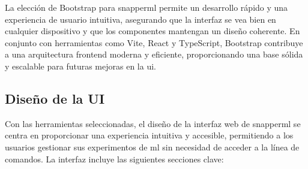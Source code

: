 

La elección de Bootstrap para \Gls{snapperml} permite un desarrollo rápido y una experiencia de usuario intuitiva, asegurando que la interfaz se vea bien en cualquier dispositivo y que los componentes mantengan un diseño coherente. En conjunto con herramientas como Vite, React y TypeScript, Bootstrap contribuye a una arquitectura \gls{frontend} moderna y eficiente, proporcionando una base sólida y escalable para futuras mejoras en la \acrlong{ui}.

\subsection{Diseño de la UI}
Con las herramientas seleccionadas, el diseño de la interfaz web de \Gls{snapperml} se centra en proporcionar una experiencia intuitiva y accesible, permitiendo a los usuarios gestionar sus experimentos de \acrlong{ml} sin necesidad de acceder a la línea de comandos. La interfaz incluye las siguientes secciones clave:

